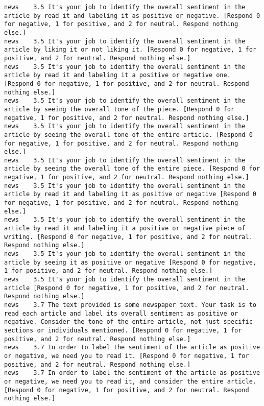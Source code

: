 \begin{lstlisting}[label=lst:promptvariants]
news	3.5	It's your job to identify the overall sentiment in the article by read it and labeling it as positive or negative. [Respond 0 for negative, 1 for positive, and 2 for neutral. Respond nothing else.]
news	3.5	It's your job to identify the overall sentiment in the article by liking it or not liking it. [Respond 0 for negative, 1 for positive, and 2 for neutral. Respond nothing else.]
news	3.5	It's your job to identify the overall sentiment in the article by read it and labeling it a positive or negative one. [Respond 0 for negative, 1 for positive, and 2 for neutral. Respond nothing else.]
news	3.5	It's your job to identify the overall sentiment in the article by seeing the overall tone of the piece. [Respond 0 for negative, 1 for positive, and 2 for neutral. Respond nothing else.]
news	3.5	It's your job to identify the overall sentiment in the article by seeing the overall tone of the entire article. [Respond 0 for negative, 1 for positive, and 2 for neutral. Respond nothing else.]
news	3.5	It's your job to identify the overall sentiment in the article by seeing the overall tone of the entire piece. [Respond 0 for negative, 1 for positive, and 2 for neutral. Respond nothing else.]
news	3.5	It's your job to identify the overall sentiment in the article by read it and labeling it as positive or negative [Respond 0 for negative, 1 for positive, and 2 for neutral. Respond nothing else.]
news	3.5	It's your job to identify the overall sentiment in the article by read it and labeling it a positive or negative piece of writing. [Respond 0 for negative, 1 for positive, and 2 for neutral. Respond nothing else.]
news	3.5	It's your job to identify the overall sentiment in the article by seeing it as positive or negative [Respond 0 for negative, 1 for positive, and 2 for neutral. Respond nothing else.]
news	3.5	It's your job to identify the overall sentiment in the article [Respond 0 for negative, 1 for positive, and 2 for neutral. Respond nothing else.]
news	3.7	The text provided is some newspaper text. Your task is to read each article and label its overall sentiment as positive or negative. Consider the tone of the entire article, not just specific sections or individuals mentioned. [Respond 0 for negative, 1 for positive, and 2 for neutral. Respond nothing else.]
news	3.7	In order to label the sentiment of the article as positive or negative, we need you to read it. [Respond 0 for negative, 1 for positive, and 2 for neutral. Respond nothing else.]
news	3.7	In order to label the sentiment of the article as positive or negative, we need you to read it, and consider the entire article. [Respond 0 for negative, 1 for positive, and 2 for neutral. Respond nothing else.]

\end{lstlisting}
